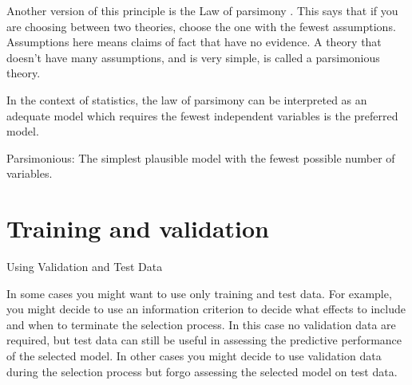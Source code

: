 \documentclass[a4paper,12pt]{article}
\begin{document}
Another version of this principle is the Law of parsimony . This says that if you are choosing between two theories, choose the one with the fewest assumptions. Assumptions here means claims of fact that have no evidence.
A theory that doesn't have many assumptions, and is very simple, is called a parsimonious theory.

In the context of statistics, the law of parsimony can be interpreted as an adequate model which requires the fewest independent variables is the preferred model.
\begin{framed}
Parsimonious: The simplest plausible model with the fewest possible number of variables.
\end{framed}




\section{Training and validation}
Using Validation and Test Data


In some cases you might want to use only training and test data. For example, you might decide to use an information criterion to decide what effects to include and when to terminate the selection process. In this case no validation data are required, but test data can still be useful in assessing the predictive performance of the selected model. In other cases you might decide to use validation data during the selection process but forgo assessing the selected model on test data. 
\end{document}
